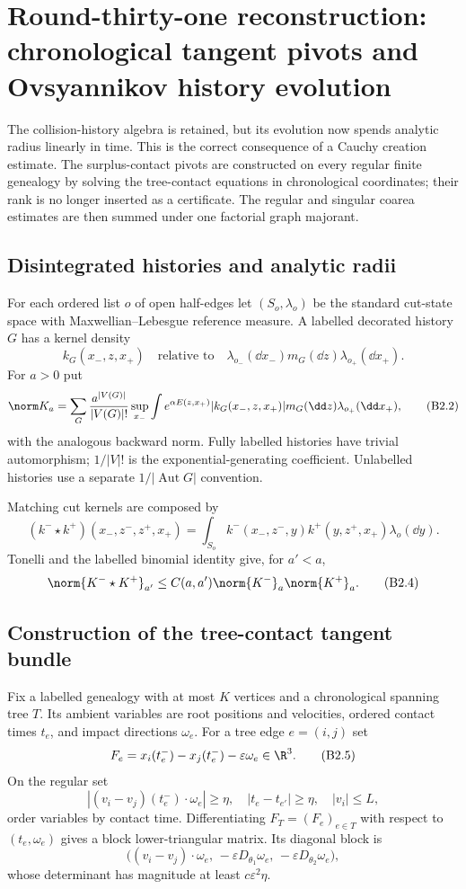 \section{Round-thirty-one reconstruction: chronological tangent pivots and Ovsyannikov history evolution}
\label{sec:r31-b2}

The collision-history algebra is retained, but its evolution now spends
analytic radius linearly in time.  This is the correct consequence of a
Cauchy creation estimate.  The surplus-contact pivots are constructed on every
regular finite genealogy by solving the tree-contact equations in
chronological coordinates; their rank is no longer inserted as a certificate.
The regular and singular coarea estimates are then summed under one factorial
graph majorant.

\subsection{Disintegrated histories and analytic radii}

For each ordered list $o$ of open half-edges let $(S_o,\lambda_o)$ be the
standard cut-state space with Maxwellian--Lebesgue reference measure.  A
labelled decorated history $G$ has a kernel density
\[
 k_G(x_-,z,x_+)\quad\text{relative to}\quad
 \lambda_{o_-}(\dd x_-)m_G(\dd z)\lambda_{o_+}(\dd x_+).                 \tag{B2.1}
\]
For $a>0$ put
\[
 \norm K_a=
 \sum_G{a^{|V(G)|}\over |V(G)|!}
 \sup_{x_-}\int e^{\alpha E(z,x_+)}
 |k_G(x_-,z,x_+)|m_G(\dd z)\lambda_{o_+}(\dd x_+),         \tag{B2.2}
\]
with the analogous backward norm.  Fully labelled histories have trivial
automorphism; $1/|V|!$ is the exponential-generating coefficient.  Unlabelled
histories use a separate $1/|\operatorname{Aut}G|$ convention.

Matching cut kernels are composed by
\[
 (k^-\star k^+)(x_-,z^-,z^+,x_+)
 =\int_{S_o}k^-(x_-,z^-,y)k^+(y,z^+,x_+)\lambda_o(\dd y).                \tag{B2.3}
\]
Tonelli and the labelled binomial identity give, for $a'<a$,
\[
 \norm{K^-\star K^+}_{a'}
 \le C(a,a')\norm{K^-}_a\norm{K^+}_a.                   \tag{B2.4}
\]

\subsection{Construction of the tree-contact tangent bundle}

Fix a labelled genealogy with at most $K$ vertices and a chronological
spanning tree $T$.  Its ambient variables are root positions and velocities,
ordered contact times $t_e$, and impact directions $\omega_e$.  For a tree
edge $e=(i,j)$ set
\[
 F_e=x_i(t_e^-)-x_j(t_e^-)-\varepsilon\omega_e\in\R^3.   \tag{B2.5}
\]
On the regular set
\[
 |(v_i-v_j)(t_e^-)\cdot\omega_e|\ge\eta,\quad
 |t_e-t_{e'}|\ge\eta,\quad |v_i|\le L,                    \tag{B2.6}
\]
order variables by contact time.  Differentiating $F_T=(F_e)_{e\in T}$ with
respect to $(t_e,\omega_e)$ gives a block lower-triangular matrix.  Its
diagonal block is
\[
 \bigl((v_i-v_j)\cdot\omega_e,\,-\varepsilon
 D_{\theta_1}\omega_e,\,-\varepsilon D_{\theta_2}\omega_e\bigr),        \tag{B2.7}
\]
whose determinant has magnitude at least $c\varepsilon^2\eta$.


